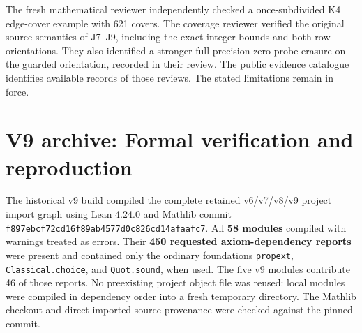 \documentclass[11pt,a4paper]{article}
\begin{document}
The fresh mathematical reviewer independently checked a once-subdivided
K4 edge-cover example with 621 covers. The coverage reviewer verified
the original source semantics of J7--J9, including the exact integer
bounds and both row orientations. They also identified a stronger
full-precision zero-probe erasure on the guarded orientation, recorded
in their review. The public evidence catalogue identifies available
records of those reviews. The stated limitations remain in force.

\section{V9 archive: Formal verification and reproduction}\label{v9-section-formal-status}

The historical v9 build compiled the complete retained v6/v7/v8/v9
project import graph using Lean 4.24.0 and Mathlib commit
\nolinkurl{f897ebcf72cd16f89ab4577d0c826cd14afaafc7}. All \textbf{58
modules} compiled with warnings treated as errors. Their \textbf{450
requested axiom-dependency reports} were present and contained only the
ordinary foundations \texttt{propext}, \texttt{Classical.choice}, and
\texttt{Quot.sound}, when used. The five v9 modules contribute 46 of
those reports. No preexisting project object file was reused: local
modules were compiled in dependency order into a fresh temporary
directory. The Mathlib checkout and direct imported source provenance
were checked against the pinned commit.
\end{document}
